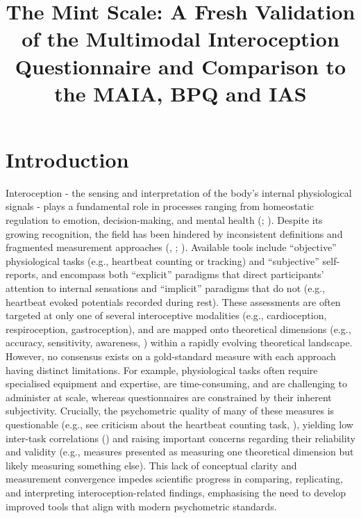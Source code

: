 \documentclass[
  jou,
  floatsintext,
  longtable,
  nolmodern,
  notxfonts,
  notimes,
  colorlinks=true,linkcolor=blue,citecolor=blue,urlcolor=blue]{apa7}
\title{\textbf{The Mint Scale: A Fresh Validation of the Multimodal
Interoception Questionnaire and Comparison to the MAIA, BPQ and IAS}}
\begin{document}
\maketitle



\setcounter{secnumdepth}{-\maxdimen} %

\setlength\LTleft{0pt}




\section{Introduction}\label{introduction}

Interoception - the sensing and interpretation of the body's internal
physiological signals - plays a fundamental role in processes ranging
from homeostatic regulation to emotion, decision-making, and mental
health (;
). Despite its growing recognition, the field has been hindered by
inconsistent definitions and fragmented measurement approaches
(,
;
). Available
tools include ``objective'' physiological tasks (e.g., heartbeat
counting or tracking) and ``subjective'' self-reports, and encompass
both ``explicit'' paradigms that direct participants' attention to
internal sensations and ``implicit'' paradigms that do not (e.g.,
heartbeat evoked potentials recorded during rest). These assessments are
often targeted at only one of several interoceptive modalities (e.g.,
cardioception, respiroception, gastroception), and are mapped onto
theoretical dimensions (e.g., accuracy, sensitivity, awareness,
) within a
rapidly evolving theoretical landscape. However, no consensus exists on
a gold-standard measure with each approach having distinct limitations.
For example, physiological tasks often require specialised equipment and
expertise, are time-consuming, and are challenging to administer at
scale, whereas questionnaires are constrained by their inherent
subjectivity. Crucially, the psychometric quality of many of these
measures is questionable (e.g., see criticism about the heartbeat
counting task, ), yielding low inter-task correlations
() and raising
important concerns regarding their reliability and validity (e.g.,
measures presented as measuring one theoretical dimension but likely
measuring something else). This lack of conceptual clarity and
measurement convergence impedes scientific progress in comparing,
replicating, and interpreting interoception-related findings,
emphasising the need to develop improved tools that align with modern
psychometric standards.
\end{document}
